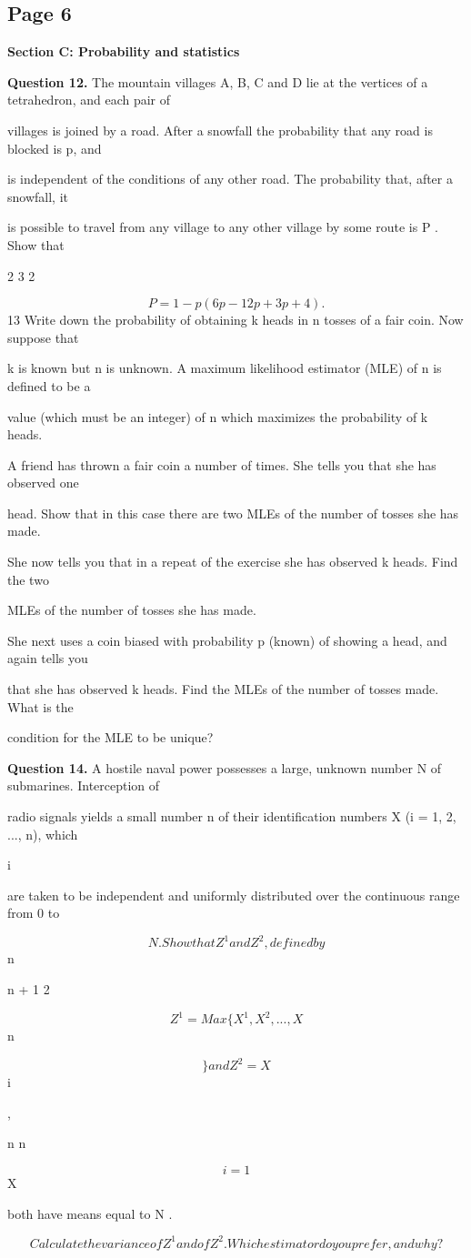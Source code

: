 \documentclass[12pt]{article}
\begin{document}
\subsection*{Page 6}
\begin{flushleft}
\bigskip\textbf{Section C: Probability and statistics}\par
\bigskip\textbf{Question 12.} The mountain villages A, B, C and D lie at the vertices of a tetrahedron, and each pair of\par
villages is joined by a road. After a snowfall the probability that any road is blocked is p, and\par
is independent of the conditions of any other road. The probability that, after a snowfall, it\par
is possible to travel from any village to any other village by some route is P . Show that\par
2 3 2\par
\[P = 1 - p (6p - 12p + 3p + 4).\]
13 Write down the probability of obtaining k heads in n tosses of a fair coin. Now suppose that\par
k is known but n is unknown. A maximum likelihood estimator (MLE) of n is defined to be a\par
value (which must be an integer) of n which maximizes the probability of k heads.\par
A friend has thrown a fair coin a number of times. She tells you that she has observed one\par
head. Show that in this case there are two MLEs of the number of tosses she has made.\par
She now tells you that in a repeat of the exercise she has observed k heads. Find the two\par
MLEs of the number of tosses she has made.\par
She next uses a coin biased with probability p (known) of showing a head, and again tells you\par
that she has observed k heads. Find the MLEs of the number of tosses made. What is the\par
condition for the MLE to be unique?\par
\bigskip\textbf{Question 14.} A hostile naval power possesses a large, unknown number N of submarines. Interception of\par
radio signals yields a small number n of their identification numbers X (i = 1, 2, ..., n), which\par
i\par
are taken to be independent and uniformly distributed over the continuous range from 0 to\par
\[N . Show that Z^1 and Z^2, defined by\]
n\par
n + 1 2\par
\[Z^1 = Max\{X^1, X^2, ..., X\]
n\par
\[\} and Z^2 = X\]
i\par
,\par
n n\par
\[i=1\]
X\par
both have means equal to N .\par
\[Calculate the variance of Z^1 and of Z^2. Which estimator do you prefer, and why?\]
\end{flushleft}
\end{document}
